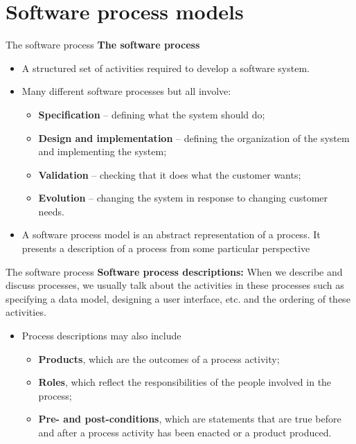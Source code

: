 \documentclass{beamer}
\begin{document}
\section{Software process models}
\begin{frame}{The software process}
	\textbf{The software process}
	\begin{itemize}
		\item A structured set of activities required to develop a software system. 
		\item Many different software processes but all involve:
		\begin{itemize}
			\item \textbf{Specification} – defining what the system should do;
			\item \textbf{Design and implementation} – defining the organization of the system and implementing the system;
			\item \textbf{Validation} – checking that it does what the customer wants;
			\item \textbf{Evolution} – changing the system in response to changing customer needs.
		\end{itemize}
	\item A software process model is an abstract representation of a process. It presents a description of a process from some particular perspective
	\end{itemize}
\end{frame}
\begin{frame}{The software process}
	\textbf{Software process descriptions:}
		When we describe and discuss processes, we usually 
	talk about the activities in these processes such as 
	specifying a data model, designing a user interface, etc. 
	and the ordering of these activities.
	\begin{itemize}

	\item Process descriptions may also include
		\begin{itemize}
			\item \textbf{Products}, which are the outcomes of a process activity; 
			\item \textbf{Roles}, which reflect the responsibilities of the people involved in the process;
			\item \textbf{Pre- and post-conditions}, which are statements that are true before and after a process activity has been enacted or a product produced.   
			
		\end{itemize}
	\end{itemize}
\end{frame}
\end{document}
